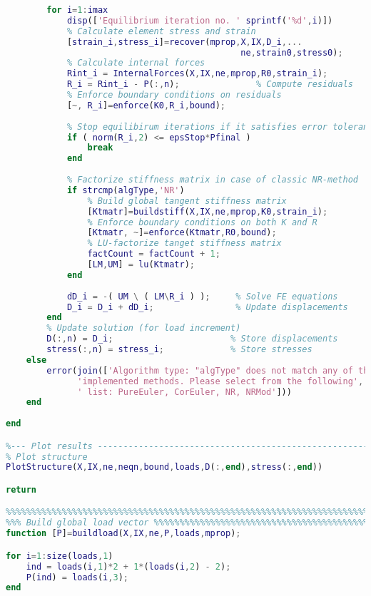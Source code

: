 \begin{lstlisting}[language=Matlab, caption = FE implementation for material non-linearity, label=lst:CodeMNA]
        % Perform equilibrium iterations
        for i=1:imax
            disp(['Equilibrium iteration no. ' sprintf('%d',i)])
            % Calculate element stress and strain
            [strain_i,stress_i]=recover(mprop,X,IX,D_i,...
                                              ne,strain0,stress0);              
            % Calculate internal forces
            Rint_i = InternalForces(X,IX,ne,mprop,R0,strain_i);
            R_i = Rint_i - P(:,n);               % Compute residuals
            % Enforce boundary conditions on residuals
            [~, R_i]=enforce(K0,R_i,bound);   
            
            % Stop equilibirum iterations if it satisfies error tolerance
            if ( norm(R_i,2) <= epsStop*Pfinal )
                break
            end
            
            % Factorize stiffness matrix in case of classic NR-method
            if strcmp(algType,'NR')
                % Build global tangent stiffness matrix
                [Ktmatr]=buildstiff(X,IX,ne,mprop,K0,strain_i);
                % Enforce boundary conditions on both K and R
                [Ktmatr, ~]=enforce(Ktmatr,R0,bound);   
                % LU-factorize tanget stiffness matrix
                factCount = factCount + 1;
                [LM,UM] = lu(Ktmatr);       
            end
            
            dD_i = -( UM \ ( LM\R_i ) );     % Solve FE equations
            D_i = D_i + dD_i;                % Update displacements        
        end
        % Update solution (for load increment) 
        D(:,n) = D_i;                       % Store displacements
        stress(:,n) = stress_i;             % Store stresses
    else
        error(join(['Algorithm type: "algType" does not match any of the',...
              'implemented methods. Please select from the following',...
              ' list: PureEuler, CorEuler, NR, NRMod']))
    end
     
end

%--- Plot results --------------------------------------------------------%
% Plot structure
PlotStructure(X,IX,ne,neqn,bound,loads,D(:,end),stress(:,end)) 

return

%%%%%%%%%%%%%%%%%%%%%%%%%%%%%%%%%%%%%%%%%%%%%%%%%%%%%%%%%%%%%%%%%%%%%%%%%%%
%%% Build global load vector %%%%%%%%%%%%%%%%%%%%%%%%%%%%%%%%%%%%%%%%%%%%%%
function [P]=buildload(X,IX,ne,P,loads,mprop);

for i=1:size(loads,1)
    ind = loads(i,1)*2 + 1*(loads(i,2) - 2);
    P(ind) = loads(i,3);
end


\end{lstlisting}

